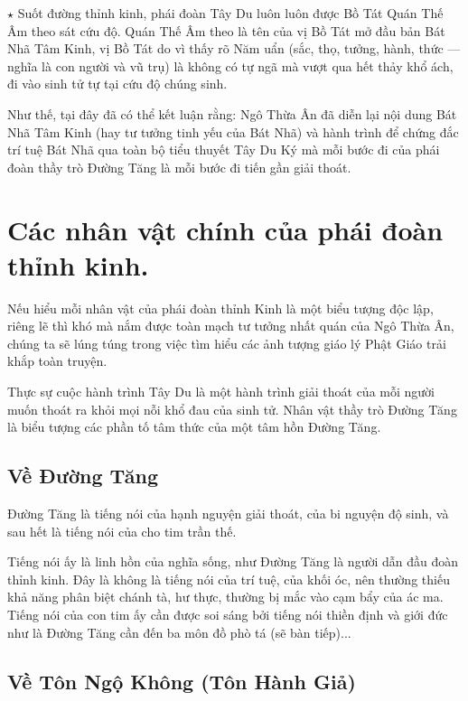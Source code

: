 $\star$ Suốt đường thỉnh kinh, phái đoàn Tây Du luôn luôn được Bồ Tát Quán Thế Âm theo sát cứu độ. Quán Thế Âm theo là tên của vị Bồ Tát mở đầu bản Bát Nhã Tâm Kinh, vị Bồ Tát do vì thấy rõ Năm uẩn (sắc, thọ, tưởng, hành, thức — nghĩa là con người và vũ trụ) là không có tự ngã mà vượt qua hết thảy khổ ách, đi vào sinh tử tự tại cứu độ chúng sinh.

Như thế, tại đây đã có thể kết luận rằng: Ngô Thừa Ân đã diễn lại nội dung Bát Nhã Tâm Kinh (hay tư tưởng tinh yếu của Bát Nhã) và hành trình để chứng đắc trí tuệ Bát Nhã qua toàn bộ tiểu thuyết Tây Du Ký mà mỗi bước đi của phái đoàn thầy trò Đường Tăng là mỗi bước đi tiến gần giải thoát.

\section{Các nhân vật chính của phái đoàn thỉnh kinh.} %
\label{sec:cac_nhan_vat_chinh_cua_phai_doan_thinh_kinh}

Nếu hiểu mỗi nhân vật của phái đoàn thỉnh Kinh là một biểu tượng độc lập, riêng lẽ thì khó mà nắm được toàn mạch tư tưởng nhất quán của Ngô Thừa Ân, chúng ta sẽ lúng túng trong việc tìm hiểu các ảnh tượng giáo lý Phật Giáo trải khắp toàn truyện.

Thực sự cuộc hành trình Tây Du là một hành trình giải thoát của mỗi người muốn thoát ra khỏi mọi nỗi khổ đau của sinh tử. Nhân vật thầy trò Đường Tăng là biểu tượng các phần tố tâm thức của một tâm hồn Đường Tăng.

\subsection{Về Đường Tăng} %
\label{sub:ve_duong_tang}


Đường Tăng là tiếng nói của hạnh nguyện giải thoát, của bi nguyện độ sinh, và sau hết là tiếng nói của cho tim trần thế.

Tiếng nói ấy là linh hồn của nghĩa sống, như Đường Tăng là người dẫn đầu đoàn thỉnh kinh. Đây là không là tiếng nói của trí tuệ, của khối óc, nên thường thiếu khả năng phân biệt chánh tà, hư thực, thường bị mắc vào cạm bẩy của ác ma. Tiếng nói của con tim ấy cần được soi sáng bởi tiếng nói thiền định và giới đức như là Đường Tăng cần đến ba môn đồ phò tá (sẽ bàn tiếp)...

\subsection{Về Tôn Ngộ Không (Tôn Hành Giả)} %
\label{sub:ve_ton_ngo_khong}

